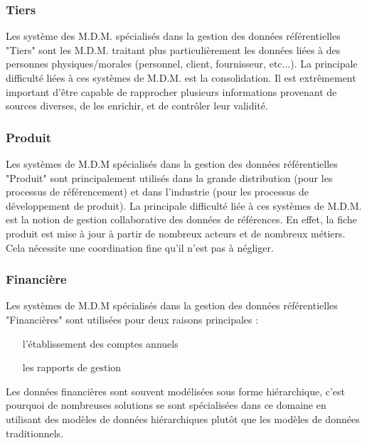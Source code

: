 \subsubsection{Tiers}

Les système des M.D.M. spécialisés dans la gestion des données référentielles "Tiers" sont les M.D.M. traitant plus particulièrement les données liées à des personnes physiques/morales (personnel, client, fournisseur, etc...).
La principale difficulté liées à ces systèmes de M.D.M. est la consolidation. Il est extrêmement important d'être capable de rapprocher plusieurs informations provenant de sources diverses, de les enrichir, et de contrôler leur validité.

\subsubsection{Produit}

Les systèmes de M.D.M spécialisés dans la gestion des données référentielles "Produit" sont principalement utilisés dans la grande distribution (pour les processus de référencement) et dans l'industrie (pour les processus de développement de produit).
La principale difficulté liée à ces systèmes de M.D.M. est la notion de gestion collaborative des données de références. En effet, la fiche produit est mise à jour à partir de nombreux acteurs et de nombreux métiers. Cela nécessite une coordination fine qu'il n'est pas à négliger.

\subsubsection{Financière}

Les systèmes de M.D.M spécialisés dans la gestion des données référentielles "Financières" sont utilisées pour deux raisons principales :

\begin{itemize}

\item[l'établissement des comptes annuels]
\item[les rapports de gestion]

\end{itemize}

Les données financières sont souvent modélisées sous forme hiérarchique, c'est pourquoi de nombreuses solutions se sont spécialisées dans ce domaine en utilisant des modèles de données hiérarchiques plutôt que les modèles de données traditionnels.